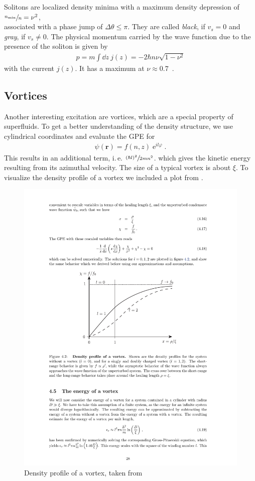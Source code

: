 Solitons are localized density minima with a maximum density depression of $\sfrac{n_{\text{min}}}{n} = \nu^2$, \\ associated with a phase jump of $\Delta\theta \leq \pi$. They are called \textit{black}, if $v_s = 0$ and \textit{gray}, if $v_s \neq 0$. The physical momentum carried by the wave function due to the presence of the soliton  is given by 
\begin{align}
	p = m \int \dd z \ j(z) = -2\hbar n \nu \sqrt{1-\nu^2}
\end{align} 
with the current $j(z)$. It has a maximum at $\nu \approx 0.7 $\ \cite{Erne2012}.

\subsection{Vortices}
Another interesting excitation are vortices, which are a special property of superfluids. To get a better understanding of the density structure, we use cylindrical coordinates and evaluate the GPE for 
\begin{align}
	\psi(\mathbf{r}) = f(n, z)\operatorname{e}^{il\varphi}.
\end{align}
This results in an additional term, i.\,e. $ \sfrac{(\hbar l)^2}{2mn^2}$. which gives the kinetic energy resulting from its azimuthal velocity. The size of a typical vortex is about $\xi$. To visualize the density profile of a vortex we included a plot from \cite{ETH}.
\begin{figure}[H]
	\centering
	\includegraphics[scale = 0.6]{figures/vertex_density}
	\caption{Density profile of a vortex, taken from \cite{ETH} }
\end{figure}
